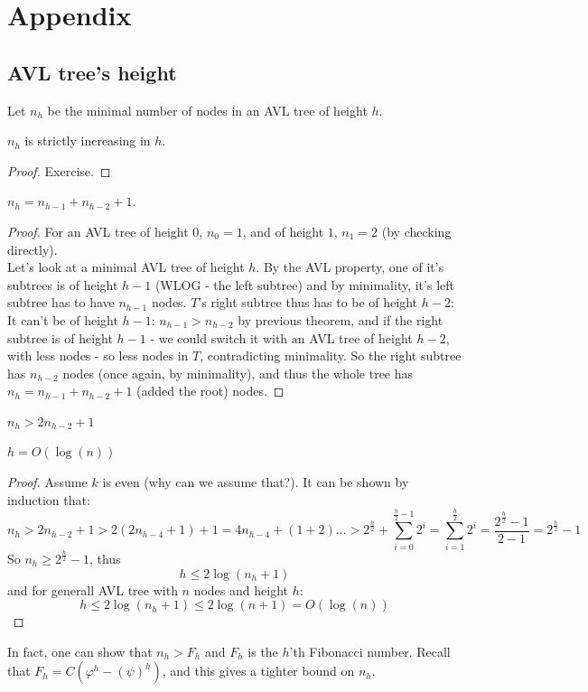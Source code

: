 \section*{Appendix}
\subsection{AVL tree's height}
Let $n_h$ be the minimal number of nodes in an AVL tree of height
$h$.\\
\begin{thm}
    $n_h$ is strictly increasing in $h$.
\end{thm}
\begin{proof} Exercise.
\end{proof}
\begin{thm}
$n_{h} = n_{h-1} + n_{h-2} + 1$.
\end{thm}
\begin{proof}For an AVL tree of height $0$, $n_0 = 1$,
and of height $1$, $n_1 = 2 $ (by checking directly).\\
    Let's look at a minimal AVL tree of height $h$. By the AVL property, one
of it's subtrees is of height $h-1$ (WLOG - the left subtree) and by
minimality, it's left subtree has to have $n_{h-1}$ nodes. $T$'s right subtree
thus has to be of height $h-2$: It can't be of height $h-1$: $n_{h-1} >
n_{h-2}$ by previous theorem, and if the right subtree is of height $h-1$ -
we could switch it with an AVL tree of height $h-2$, with less nodes - so
less nodes in $T$, contradicting minimality. So the right subtree has
$n_{h-2}$ nodes (once again, by minimality), and thus the whole tree has
    $n_{h} = n_{h-1} + n_{h-2} + 1$ (added the root) nodes.
\end{proof}
\begin{cor}$n_h > 2n_{h-2} + 1$
\end{cor}
\begin{cor}$h = O(\log(n))$
\end{cor}
\begin{proof}
    Assume $k$ is even (why can we assume that?).
    It can be shown by induction that:
    \[
        n_h>2n_{h-2}+1>2(2n_{h-4}+1)+1=4n_{h-4}+(1+2)\ldots >
        2^{\frac{h}{2}}+\sum_{i=0}^{\frac{h}{2}-1}
        2^i=\sum_{i=1}^{\frac{h}{2}}2^i = \frac{2^\frac{h}{2} - 1}{2-1} =  2^{\frac{h}{2}} - 1
    \]
    So $n_h \geq 2^{\frac{h}{2}} - 1$, thus
    \[
        h\leq 2\log(n_h + 1)
    \]
    and for generall AVL tree with $n$ nodes and height $h$:
    \[
         h\leq 2\log(n_h + 1) \leq 2\log(n + 1) = O(\log(n))
    \]
\end{proof}
\begin{remark}
    In fact, one can show that $n_h > F_h$ and $F_h$ is the $h$'th Fibonacci
    number. Recall that $F_h = C(\varphi^h - (\psi)^h)$, and this gives a
    tighter bound on $n_h$.
\end{remark}



